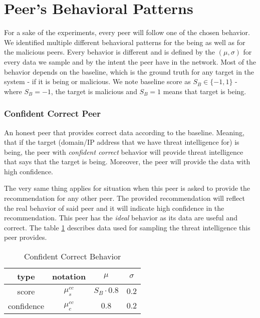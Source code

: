 \section{Peer's Behavioral Patterns}
\label{sec:peers-behavioral-patterns}
For a sake of the experiments, every peer will follow one of the chosen behavior.
We identified multiple different behavioral patterns for the being as well as for the malicious peers.
Every behavior is different and is defined by the $(\mu, \sigma)$ for every data we sample and by the intent the peer have in the network.
Most of the behavior depends on the baseline, which is the ground truth for any target in the system - if it is being or malicious.
We note baseline score as $S_{B} \in \{-1, 1\}$ - where $S_{B} = -1$, the target is malicious and $S_{B} = 1$ means that target is being.


\subsubsection{Confident Correct Peer}
\label{subsubsec:confident-correct-peer}
An honest peer that provides correct data according to the baseline. 
Meaning, that if the target (domain/IP address that we have threat intelligence for) is being, the peer with \textit{confident correct} behavior will provide threat intelligence that says that the target is being. 
Moreover, the peer will provide the data with high confidence.

The very same thing applies for situation when this peer is asked to provide the recommendation for any other peer. 
The provided recommendation will reflect the real behavior of said peer and it will indicate high confidence in the recommendation.
This peer has the \textit{ideal} behavior as its data are useful and correct.
The table \ref{tab:confident-correct} describes data used for sampling the threat intelligence this peer provides.

\begin{table}[!ht]
    \centering
    \begin{tabular}{c|c|c|c}
        type & notation & $\mu$ & $\sigma$ \\
        \hline
        score & $\mu^{cc}_{s}$ & $S_{B} \cdot 0.8$ & $0.2$ \\
        confidence & $\mu^{cc}_{c}$ &  $0.8$ & $0.2$ \\
    \end{tabular}
    \caption{Confident Correct Behavior}
    \label{tab:confident-correct}
\end{table}

